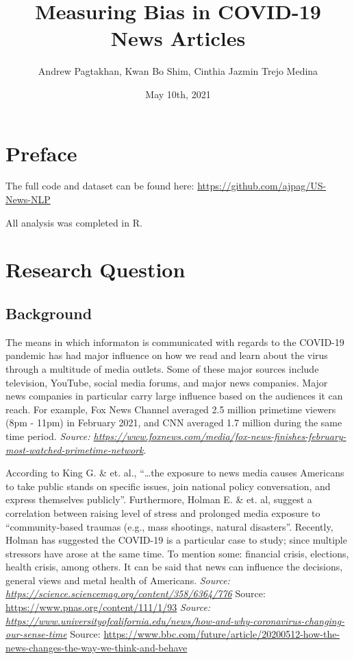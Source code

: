 \documentclass[
]{article}
\title{Measuring Bias in COVID-19 News Articles}
\author{Andrew Pagtakhan, Kwan Bo Shim, Cinthia Jazmin Trejo Medina}
\date{May 10th, 2021}
\begin{document}
\maketitle

{
\setcounter{tocdepth}{3}
\tableofcontents
}
\hypertarget{preface}{%
\section{Preface}\label{preface}}

The full code and dataset can be found here:
\url{https://github.com/ajpag/US-News-NLP}

All analysis was completed in R.

\hypertarget{research-question}{%
\section{Research Question}\label{research-question}}

\hypertarget{background}{%
\subsection{Background}\label{background}}

The means in which informaton is communicated with regards to the
COVID-19 pandemic has had major influence on how we read and learn about
the virus through a multitude of media outlets. Some of these major
sources include television, YouTube, social media forums, and major news
companies. Major news companies in particular carry large influence
based on the audiences it can reach. For example, Fox News Channel
averaged 2.5 million primetime viewers (8pm - 11pm) in February 2021,
and CNN averaged 1.7 million during the same time period. \emph{Source:
\url{https://www.foxnews.com/media/fox-news-finishes-february-most-watched-primetime-network}}.

According to King G. \& et. al., ``\ldots the exposure to news media
causes Americans to take public stands on specific issues, join national
policy conversation, and express themselves publicly''. Furthermore,
Holman E. \& et. al, suggest a correlation between raising level of
stress and prolonged media exposure to ``community-based traumas (e.g.,
mass shootings, natural disasters''. Recently, Holman has suggested the
COVID-19 is a particular case to study; since multiple stressors have
arose at the same time. To mention some: financial crisis, elections,
health crisis, among others. It can be said that news can influence the
decisions, general views and metal health of Americans. \emph{Source:
\url{https://science.sciencemag.org/content/358/6364/776} }Source:
\url{https://www.pnas.org/content/111/1/93} \emph{Source:
\url{https://www.universityofcalifornia.edu/news/how-and-why-coronavirus-changing-our-sense-time}
}Source:
\url{https://www.bbc.com/future/article/20200512-how-the-news-changes-the-way-we-think-and-behave}
\end{document}
